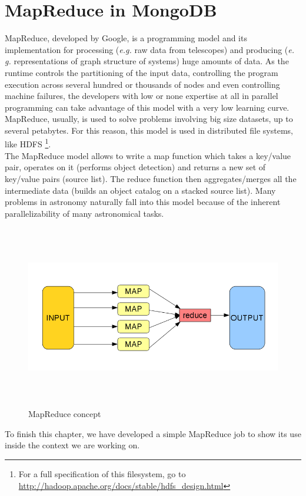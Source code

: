 \section{MapReduce in MongoDB}

MapReduce, developed by Google, is a programming model and its implementation for processing (\textit{e.g.} raw data from telescopes) and producing (\textit{e. g.} representations of graph structure of systems) huge amounts of data. As the runtime controls the partitioning of the input data, controlling the program execution across several hundred or thousands of nodes and even controlling machine failures, the developers with low or none expertise at all in parallel programming can take advantage of this model with a very low learning curve.\\

MapReduce, usually, is used to solve problems involving big size datasets, up to several petabytes. For this reason, this model is used in distributed file systems, like HDFS \footnote{For a full specification of this filesystem, go to \url{http://hadoop.apache.org/docs/stable/hdfs_design.html}}.\\

The MapReduce model allows to write a map function which takes a key/value pair, operates on it (performs object detection) and returns a new set of key/value pairs (source list). The reduce function then aggregates/merges all the intermediate data (builds an object catalog on a stacked source list). Many problems in astronomy naturally fall into this model because of the inherent parallelizability of many astronomical tasks.

\begin{figure}[H]
\centering
\includegraphics[width=16cm,height=8cm]{images/map_reduce_chart.png}
\caption{MapReduce concept}
\end{figure}

\newpage

To finish this chapter, we have developed a simple MapReduce job to show its use inside the context we are working on.

